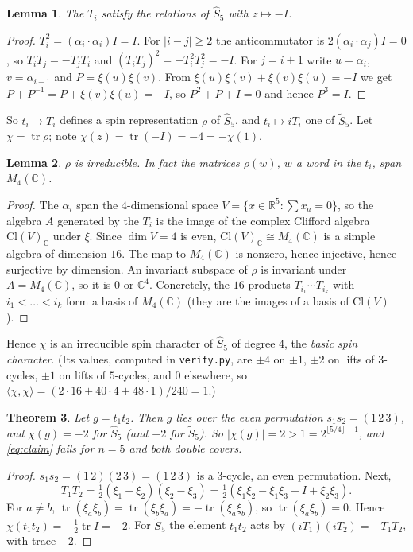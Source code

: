 \documentclass[11pt]{article}
\newtheorem{theorem}{Theorem}
\newtheorem{lemma}[theorem]{Lemma}
\theoremstyle{remark}
\newcommand{\tr}{\operatorname{tr}}
\newcommand{\Sh}{\widehat{S}}
\newcommand{\St}{\widetilde{S}}
\begin{document}
\begin{lemma}\label{lem:rel}
The $T_i$ satisfy the relations of $\Sh_5$ with $z\mapsto -I$.
\end{lemma}
\begin{proof}
$T_i^2=(\alpha_i\cdot\alpha_i)I=I$. For $|i-j|\ge2$ the anticommutator is
$2(\alpha_i\cdot\alpha_j)I=0$, so $T_iT_j=-T_jT_i$ and $(T_iT_j)^2=-T_i^2T_j^2=-I$. For
$j=i+1$ write $u=\alpha_i$, $v=\alpha_{i+1}$ and $P=\xi(u)\xi(v)$. From
$\xi(u)\xi(v)+\xi(v)\xi(u)=-I$ we get $P+P^{-1}=P+\xi(v)\xi(u)=-I$, so $P^2+P+I=0$ and hence
$P^3=I$.
\end{proof}

So $t_i\mapsto T_i$ defines a spin representation $\rho$ of $\Sh_5$, and $t_i\mapsto iT_i$ one of
$\St_5$. Let $\chi=\tr\rho$; note $\chi(z)=\tr(-I)=-4=-\chi(1)$.

\begin{lemma}\label{lem:irr}
$\rho$ is irreducible. In fact the matrices $\rho(w)$, $w$ a word in the $t_i$, span $M_4(\mathbb{C})$.
\end{lemma}
\begin{proof}
The $\alpha_i$ span the $4$-dimensional space $V=\{x\in\mathbb{R}^5:\sum x_a=0\}$, so the algebra
$A$ generated by the $T_i$ is the image of the complex Clifford algebra $\mathrm{Cl}(V)_\mathbb{C}$
under $\xi$. Since $\dim V=4$ is even, $\mathrm{Cl}(V)_\mathbb{C}\cong M_4(\mathbb{C})$ is a simple
algebra of dimension $16$. The map to $M_4(\mathbb{C})$ is nonzero, hence injective, hence
surjective by dimension. An invariant subspace of $\rho$ is invariant under $A=M_4(\mathbb{C})$,
so it is $0$ or $\mathbb{C}^4$. Concretely, the $16$ products $T_{i_1}\cdots T_{i_k}$ with
$i_1<\dots<i_k$ form a basis of $M_4(\mathbb{C})$ (they are the images of a basis of
$\mathrm{Cl}(V)$).
\end{proof}

Hence $\chi$ is an irreducible spin character of $\Sh_5$ of degree $4$, the \emph{basic spin
character}. (Its values, computed in \texttt{verify.py}, are $\pm4$ on $\pm1$, $\pm2$ on lifts of
$3$-cycles, $\pm1$ on lifts of $5$-cycles, and $0$ elsewhere, so $\langle\chi,\chi\rangle=
(2\cdot16+40\cdot4+48\cdot1)/240=1$.)

\begin{theorem}\label{thm:main}
Let $g=t_1t_2$. Then $g$ lies over the even permutation $s_1s_2=(1\,2\,3)$, and
$\chi(g)=-2$ for $\Sh_5$ (and $+2$ for $\St_5$). So
$|\chi(g)|=2>1=2^{\lfloor5/4\rfloor-1}$, and \eqref{eq:claim} fails for $n=5$ and both
double covers.
\end{theorem}
\begin{proof}
$s_1s_2=(1\,2)(2\,3)=(1\,2\,3)$ is a $3$-cycle, an even permutation. Next,
\[
T_1T_2=\tfrac12(\xi_1-\xi_2)(\xi_2-\xi_3)=\tfrac12(\xi_1\xi_2-\xi_1\xi_3-I+\xi_2\xi_3).
\]
For $a\ne b$, $\tr(\xi_a\xi_b)=\tr(\xi_b\xi_a)=-\tr(\xi_a\xi_b)$, so $\tr(\xi_a\xi_b)=0$.
Hence $\chi(t_1t_2)=-\tfrac12\tr I=-2$. For $\St_5$ the element $t_1t_2$ acts by
$(iT_1)(iT_2)=-T_1T_2$, with trace $+2$.
\end{proof}
\end{document}
